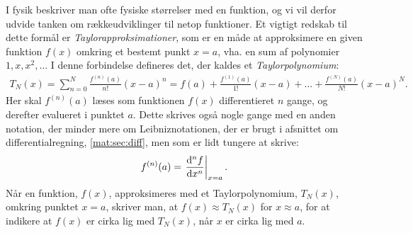 \begin{example} \label{mat:ex:taylor}%
I fysik beskriver man ofte fysiske størrelser med en funktion, og vi vil derfor udvide tanken om rækkeudviklinger til netop funktioner. %
Et vigtigt redskab til dette formål er \emph{Taylorapproksimationer}, som er en måde at approksimere en given funktion $f(x)$ omkring et bestemt punkt $x=a$, vha. en sum af polynomier $1,x,x^2,\dots{}$ I denne forbindelse defineres det, der kaldes et \emph{Taylorpolynomium}:
%
\begin{align}
\label{mat:eq:Taylor_pol}
    T_N(x) = \sum\limits_{n = 0}^{N} \frac{f^{(n)}(a)}{n!} (x-a)^n = f(a) + \frac{f^{(1)}(a)}{1!} (x-a)  + \dots{} + \frac{f^{(N)}(a)}{N!}(x-a)^N.
\end{align}
%
Her skal $f^{(n)}(a)$ læses som funktionen $f(x)$ differentieret $n$ gange, og derefter evalueret i punktet $a$. Dette skrives også nogle gange med en anden notation, der minder mere om Leibniznotationen, der er brugt i afsnittet om differentialregning, \cref{mat:sec:diff}, men som er lidt tungere at skrive:
%
\begin{align} \label{mat:eq:diff_eval}
    f^{(n)}(a) = \left. \dv[n]{f}{x} \right|_ {x=a}.
\end{align}
%
Når en funktion, $f(x)$, approksimeres med et Taylorpolynomium, $T_N(x)$, omkring punktet $x=a$, skriver man, at $f(x) \approx T_N(x)$ for $x \approx a$, for at indikere at $f(x)$ er cirka lig med $T_N(x)$, når $x$ er cirka lig med $a$.
\end{example}

